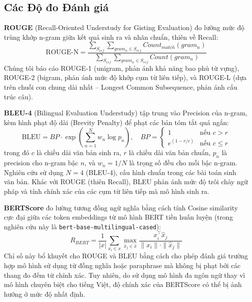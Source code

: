 \documentclass{article}
\begin{document}
\subsection{Các Độ đo Đánh giá}

\textbf{ROUGE} (Recall-Oriented Understudy for Gisting Evaluation) \cite{rouge_original} đo lường mức độ trùng khớp n-gram giữa kết quả sinh ra và nhãn chuẩn, thiên về Recall:
\begin{equation}
    \text{ROUGE-N} = \frac{\sum_{S_{ref}} \sum_{gram_n \in S_{ref}} Count_{match}(gram_n)}{\sum_{S_{ref}} \sum_{gram_n \in S_{ref}} Count(gram_n)}
\end{equation}
Chúng tôi báo cáo ROUGE-1 (unigram, phản ánh khả năng bao phủ từ vựng), ROUGE-2 (bigram, phản ánh mức độ khớp cụm từ liên tiếp), và ROUGE-L (dựa trên chuỗi con chung dài nhất -- Longest Common Subsequence, phản ánh cấu trúc câu).

\textbf{BLEU-4} (Bilingual Evaluation Understudy) \cite{bleu_original} tập trung vào Precision của n-gram, kèm hình phạt độ dài (Brevity Penalty) để phạt các bản tóm tắt quá ngắn:
\begin{equation}
    \text{BLEU} = BP \cdot \exp\left( \sum_{n=1}^N w_n \log p_n \right), \quad BP = \begin{cases} 1 & \text{nếu } c > r \\ e^{(1 - r/c)} & \text{nếu } c \leq r \end{cases}
\end{equation}
trong đó $c$ là chiều dài văn bản sinh ra, $r$ là chiều dài văn bản chuẩn, $p_n$ là precision cho n-gram bậc $n$, và $w_n = 1/N$ là trọng số đều cho mỗi bậc n-gram. Nghiên cứu sử dụng $N=4$ (BLEU-4), cấu hình chuẩn trong các bài toán sinh văn bản. Khác với ROUGE (thiên Recall), BLEU phản ánh mức độ trôi chảy ngữ pháp và tính chính xác của các cụm từ liên tiếp mà mô hình sinh ra.

\textbf{BERTScore} \cite{bertscore} đo lường tương đồng ngữ nghĩa bằng cách tính Cosine similarity cực đại giữa các token embeddings từ mô hình BERT tiền huấn luyện (trong nghiên cứu này là \texttt{bert-base-multilingual-cased}):
\begin{equation}
    R_{BERT} = \frac{1}{|x|} \sum_{x_i \in x} \max_{\hat{x}_j \in \hat{x}} \frac{x_i^\top \hat{x}_j}{\|x_i\| \cdot \|\hat{x}_j\|}
\end{equation}
Chỉ số này bổ khuyết cho ROUGE và BLEU bằng cách cho phép đánh giá trường hợp mô hình sử dụng từ đồng nghĩa hoặc paraphrase mà không bị phạt bởi các thang đo đếm từ chính xác. Tuy nhiên, do sử dụng mô hình đa ngôn ngữ thay vì mô hình chuyên biệt cho tiếng Việt, độ chính xác của BERTScore có thể bị ảnh hưởng ở mức độ nhất định.
\end{document}
